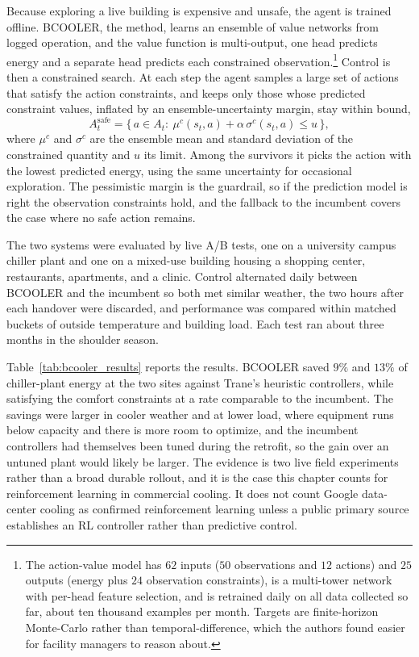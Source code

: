 Because exploring a live building is expensive and unsafe, the agent is trained offline. BCOOLER, the method, learns an ensemble of value networks from logged operation, and the value function is multi-output, one head predicts energy and a separate head predicts each constrained observation.\footnote{The action-value model has $62$ inputs ($50$ observations and $12$ actions) and $25$ outputs (energy plus $24$ observation constraints), is a multi-tower network with per-head feature selection, and is retrained daily on all data collected so far, about ten thousand examples per month. Targets are finite-horizon Monte-Carlo rather than temporal-difference, which the authors found easier for facility managers to reason about.} Control is then a constrained search. At each step the agent samples a large set of actions that satisfy the action constraints, and keeps only those whose predicted constraint values, inflated by an ensemble-uncertainty margin, stay within bound,
\begin{equation}
A_t^{\mathrm{safe}}=\big\{\,a\in A_t:\ \mu^{c}(s_t,a)+\alpha\,\sigma^{c}(s_t,a)\le u\,\big\},
\end{equation}
where $\mu^{c}$ and $\sigma^{c}$ are the ensemble mean and standard deviation of the constrained quantity and $u$ its limit. Among the survivors it picks the action with the lowest predicted energy, using the same uncertainty for occasional exploration. The pessimistic margin is the guardrail, so if the prediction model is right the observation constraints hold, and the fallback to the incumbent covers the case where no safe action remains.

The two systems were evaluated by live A/B tests, one on a university campus chiller plant and one on a mixed-use building housing a shopping center, restaurants, apartments, and a clinic. Control alternated daily between BCOOLER and the incumbent so both met similar weather, the two hours after each handover were discarded, and performance was compared within matched buckets of outside temperature and building load. Each test ran about three months in the shoulder season.

Table~\ref{tab:bcooler_results} reports the results. BCOOLER saved $9\%$ and $13\%$ of chiller-plant energy at the two sites against Trane's heuristic controllers, while satisfying the comfort constraints at a rate comparable to the incumbent. The savings were larger in cooler weather and at lower load, where equipment runs below capacity and there is more room to optimize, and the incumbent controllers had themselves been tuned during the retrofit, so the gain over an untuned plant would likely be larger. The evidence is two live field experiments rather than a broad durable rollout, and it is the case this chapter counts for reinforcement learning in commercial cooling. It does not count Google data-center cooling as confirmed reinforcement learning unless a public primary source establishes an RL controller rather than predictive control.

